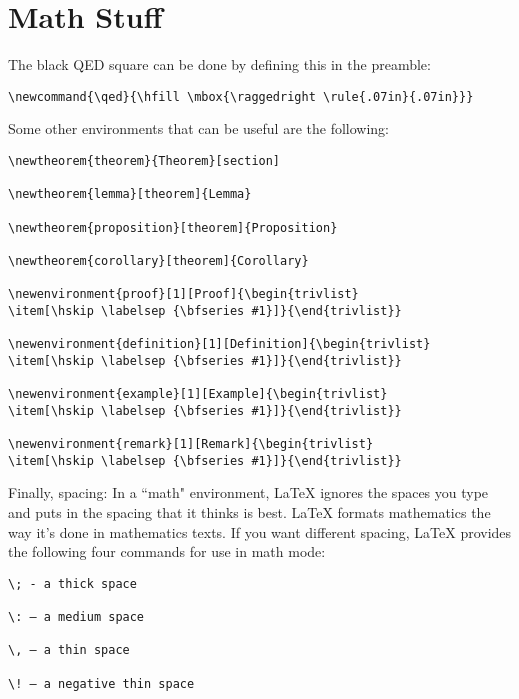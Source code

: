 \documentclass[a4paper,10pt,twocolumn]{article}
\begin{document}
\section{Math Stuff}
The black QED square can be done by defining this in the preamble:
\begin{verbatim}
\newcommand{\qed}{\hfill \mbox{\raggedright \rule{.07in}{.07in}}}
\end{verbatim}
Some other environments that can be useful are the following:
\begin{verbatim}
\newtheorem{theorem}{Theorem}[section]

\newtheorem{lemma}[theorem]{Lemma}

\newtheorem{proposition}[theorem]{Proposition}

\newtheorem{corollary}[theorem]{Corollary}

\newenvironment{proof}[1][Proof]{\begin{trivlist}
\item[\hskip \labelsep {\bfseries #1}]}{\end{trivlist}}

\newenvironment{definition}[1][Definition]{\begin{trivlist}
\item[\hskip \labelsep {\bfseries #1}]}{\end{trivlist}}

\newenvironment{example}[1][Example]{\begin{trivlist}
\item[\hskip \labelsep {\bfseries #1}]}{\end{trivlist}}

\newenvironment{remark}[1][Remark]{\begin{trivlist}
\item[\hskip \labelsep {\bfseries #1}]}{\end{trivlist}}
\end{verbatim}

Finally, spacing: In a ``math" environment, LaTeX ignores the spaces you type 
and puts in the spacing that it thinks is best. LaTeX formats mathematics the
way it’s done in mathematics texts. If you want different spacing, LaTeX 
provides the following four commands for use in math mode:

\begin{verbatim}
\; - a thick space

\: – a medium space

\, – a thin space

\! – a negative thin space 
\end{verbatim}

\end{document}
